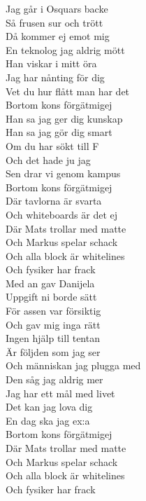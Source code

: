 \documentclass[a6paper, 10pt, twoside]{article}
\begin{document}
\begin{center}
\end{center}
\begin{lyrics}
Jag går i Osquars backe\\
Så frusen sur och trött\\
Då kommer ej emot mig\\
En teknolog jag aldrig mött
\vspace{5pt}\\
Han viskar i mitt öra\\
Jag har nånting för dig\\
Vet du hur flått man har det\\
Bortom kons förgätmigej
\vspace{5pt}\\
Han sa jag ger dig kunskap\\
Han sa jag gör dig smart\\
Om du har sökt till F\\
Och det hade ju jag
\vspace{5pt}\\
Sen drar vi genom kampus\\
Bortom kons förgätmigej\\
Där tavlorna är svarta\\
Och whiteboards är det ej
\vspace{5pt}\\
Där Mats trollar med matte\\
Och Markus spelar schack\\
Och alla block är whitelines\\
Och fysiker har frack
\vspace{5pt}\\
Med an gav Danijela\\
Uppgift ni borde sätt\\
För assen var försiktig\\
Och gav mig inga rätt
\vspace{5pt}\\
\newpage
\noindent
Ingen hjälp till tentan\\
Är följden som jag ser\\
Och människan jag plugga med\\
Den såg jag aldrig mer
\vspace{5pt}\\
Jag har ett mål med livet\\
Det kan jag lova dig\\
En dag ska jag ex:a\\
Bortom kons förgätmigej
\vspace{5pt}\\
Där Mats trollar med matte\\
Och Markus spelar schack\\
Och alla block är whitelines\\
Och fysiker har frack\\
\end{lyrics}
\end{document}
